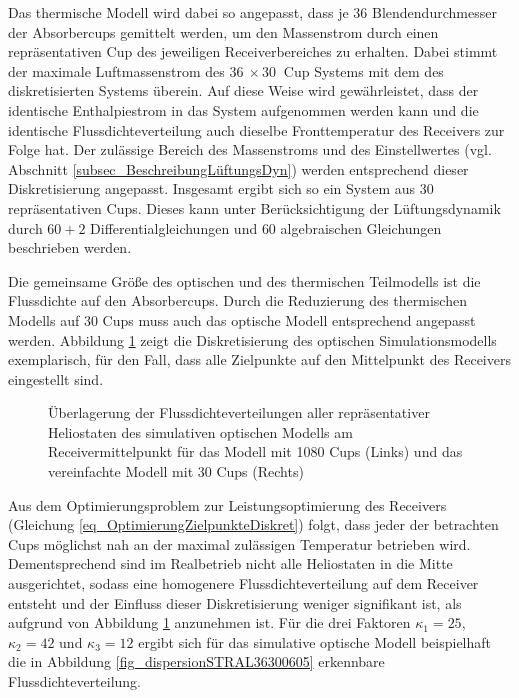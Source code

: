 Das thermische Modell wird dabei so angepasst, dass je $36$ Blendendurchmesser der Absorbercups gemittelt werden, um den Massenstrom durch einen repräsentativen Cup des jeweiligen Receiverbereiches zu erhalten.
Dabei stimmt der maximale Luftmassenstrom des $\SI{36}{} \times \SI{30}{}$ Cup Systems mit dem des diskretisierten Systems überein.
Auf diese Weise wird gewährleistet, dass der identische Enthalpiestrom in das System aufgenommen werden kann und die identische Flussdichteverteilung auch dieselbe Fronttemperatur des Receivers zur Folge hat.
Der zulässige Bereich des Massenstroms und des Einstellwertes (vgl. Abschnitt \ref{subsec_BeschreibungLüftungsDyn}) werden entsprechend dieser Diskretisierung angepasst.
Insgesamt ergibt sich so ein System aus $30$ repräsentativen Cups.
Dieses kann unter Berücksichtigung der Lüftungsdynamik durch $60+2$ Differentialgleichungen und $60$ algebraischen Gleichungen beschrieben werden.

Die gemeinsame Größe des optischen und des thermischen Teilmodells ist die Flussdichte auf den Absorbercups.
Durch die Reduzierung des thermischen Modells auf $30$ Cups muss auch das optische Modell entsprechend angepasst werden.
Abbildung \ref{fig_statischerZielpunkt363065} zeigt die Diskretisierung des optischen Simulationsmodells exemplarisch, für den Fall, dass alle Zielpunkte auf den Mittelpunkt des Receivers eingestellt sind. \newpage

\begin{figure}[h!]
    \centering
    \setlength{\fboxsep}{1pt}
    \setlength{\fboxrule}{1pt}
    \caption[Überlagerung der Flussdichteverteilungen aller repräsentativer Heliostaten des simulativen optischen Modells am Receivermittelpunkt für das Modell mit 1080 Cups und das vereinfachte Modell mit 30 Cups]{Überlagerung der Flussdichteverteilungen aller repräsentativer Heliostaten des simulativen optischen Modells am Receivermittelpunkt für das Modell mit 1080 Cups (Links) und das vereinfachte Modell mit 30 Cups (Rechts)}
    \label{fig_statischerZielpunkt363065}
\end{figure}

Aus dem Optimierungsproblem zur Leistungsoptimierung des Receivers (Gleichung \ref{eq_OptimierungZielpunkteDiskret}) folgt, dass jeder der betrachten Cups möglichst nah an der maximal zulässigen Temperatur betrieben wird.
Dementsprechend sind im Realbetrieb nicht alle Heliostaten in die Mitte ausgerichtet, sodass eine homogenere Flussdichteverteilung auf dem Receiver entsteht und der Einfluss dieser Diskretisierung weniger signifikant ist, als aufgrund von Abbildung \ref{fig_statischerZielpunkt363065} anzunehmen ist.
Für die drei Faktoren $\kappa_1 = 25$, $\kappa_2 = 42$ und $\kappa_3 = 12$ ergibt sich für das simulative optische Modell beispielhaft die in Abbildung \ref{fig_dispersionSTRAL36300605} erkennbare Flussdichteverteilung.

